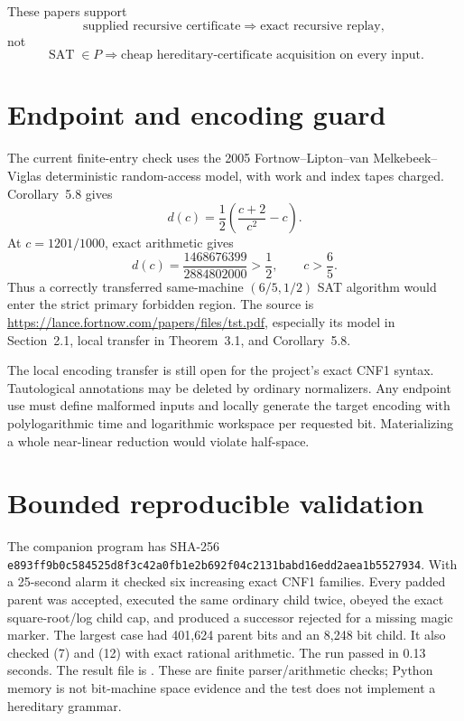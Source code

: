 \documentclass[11pt]{article}
\newcommand{\SAT}{\operatorname{SAT}}
\begin{document}
These papers support
\[
 \text{supplied recursive certificate}\Longrightarrow
 \text{exact recursive replay},                             \tag{10}
\]
not
\[
 \SAT\in P\Longrightarrow
 \text{cheap hereditary-certificate acquisition on every input}. \tag{11}
\]

\section{Endpoint and encoding guard}
The current finite-entry check uses the 2005 Fortnow--Lipton--van
Melkebeek--Viglas deterministic random-access model, with work and index tapes
charged.  Corollary~5.8 gives
\[
 d(c)=\frac12\left(\frac{c+2}{c^2}-c\right).
\]
At $c=1201/1000$, exact arithmetic gives
\[
 d(c)=\frac{1468676399}{2884802000}>\frac12,
 \qquad c>\frac65.                                         \tag{12}
\]
Thus a correctly transferred same-machine $(6/5,1/2)$ SAT algorithm would
enter the strict primary forbidden region.  The source is
\url{https://lance.fortnow.com/papers/files/tst.pdf}, especially its model in
Section~2.1, local transfer in Theorem~3.1, and Corollary~5.8.

The local encoding transfer is still open for the project's exact CNF1
syntax.  Tautological annotations may be deleted by ordinary normalizers.
Any endpoint use must define malformed inputs and locally generate the target
encoding with polylogarithmic time and logarithmic workspace per requested
bit.  Materializing a whole near-linear reduction would violate half-space.

\section{Bounded reproducible validation}
The companion program
 has SHA-256
\nolinkurl{e893ff9b0c584525d8f3c42a0fb1e2b692f04c2131babd16edd2aea1b5527934}.
With a 25-second alarm it checked six increasing exact CNF1 families.  Every
padded parent was accepted, executed the same ordinary child twice, obeyed
the exact square-root/log child cap, and produced a successor rejected for a
missing magic marker.  The largest case had 401,624 parent bits and an 8,248
bit child.  It also checked (7) and (12) with exact rational arithmetic.  The
run passed in 0.13 seconds.  The result file is
.  These are
finite parser/arithmetic checks; Python memory is not bit-machine space
evidence and the test does not implement a hereditary grammar.
\end{document}

